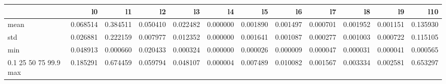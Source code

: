 \begin{tabular}{lrrrrrrrrrrr}
\toprule
 & l0 & l1 & l2 & l3 & l4 & l5 & l6 & l7 & l8 & l9 & l10 \\
\midrule
mean & 0.068514 & 0.384511 & 0.050410 & 0.022482 & 0.000000 & 0.001890 & 0.001497 & 0.000701 & 0.001952 & 0.001151 & 0.135930 \\
std & 0.026881 & 0.222159 & 0.007977 & 0.012352 & 0.000000 & 0.001641 & 0.001087 & 0.000277 & 0.001003 & 0.000722 & 0.115105 \\
min & 0.048913 & 0.000660 & 0.020433 & 0.000324 & 0.000000 & 0.000026 & 0.000009 & 0.000047 & 0.000031 & 0.000041 & 0.000565 \\
0.1%
25%
50%
75%
99.9%
max & 0.185291 & 0.674459 & 0.059794 & 0.048107 & 0.000004 & 0.007489 & 0.010082 & 0.001567 & 0.003334 & 0.002581 & 0.653297 \\
\bottomrule
\end{tabular}
